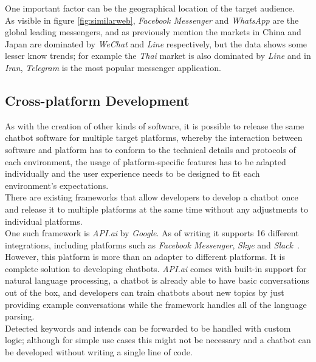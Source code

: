 \label{geography}

One important factor can be the geographical location of the target audience.
\\
As visible in figure \ref{fig:similarweb}, \emph{Facebook Messenger} and \emph{WhatsApp} are the global leading messengers,
and as previously mention the markets in China and Japan are dominated by \emph{WeChat} and \emph{Line} respectively,
but the data shows some lesser know trends; for example the \emph{Thai} market is also dominated by \emph{Line}
and in \emph{Iran}, \emph{Telegram} is the most popular messenger application.


\subsection{Cross-platform Development}
\label{crossplatform}

As with the creation of other kinds of software, it is possible to release the same chatbot software for multiple target platforms,
whereby the interaction between software and platform has to conform to the technical details and protocols of each environment, the usage of platform-specific features has to be adapted individually and the user experience needs to be designed to fit each environment's expectations.
\\

There are existing frameworks that allow developers to develop a chatbot once and release it to multiple platforms at the same time without any adjustments to individual platforms.
\\
One such framework is \emph{API.ai} by \emph{Google}.
As of writing it supports 16 different integrations, including platforms such as \emph{Facebook Messenger}, \emph{Skye} and \emph{Slack}~\cite{apiai}.
However, this platform is more than an adapter to different platforms.
It is complete solution to developing chatbots.
\emph{API.ai} comes with built-in support for natural language processing,
a chatbot is already able to have basic conversations out of the box,
and developers can train chatbots about new topics by just providing example conversations while the framework handles all of the language parsing.
\\
Detected keywords and intends can be forwarded to be handled with custom logic;
although for simple use cases this might not be necessary and a chatbot can be developed without writing a single line of code.
\\

